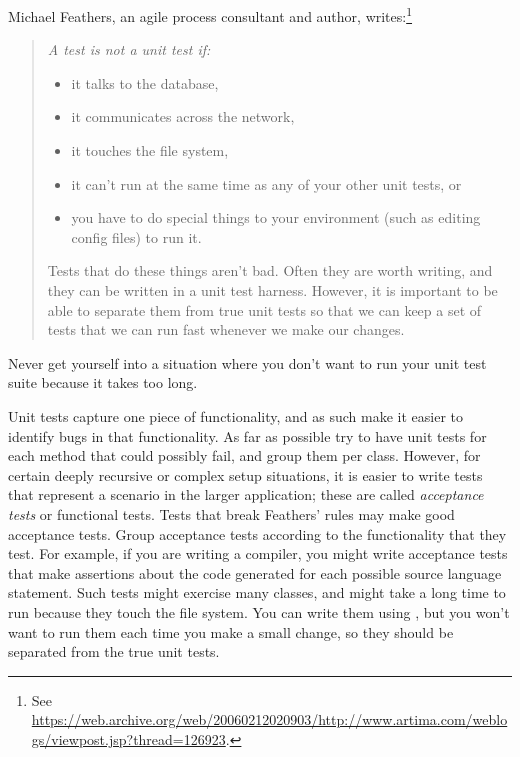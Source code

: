 \documentclass[a4paper,10pt,twoside]{book}
\begin{document}
{\begin{description}
\item[Feathers' Rules for Unit tests.]
	Michael Feathers, an  agile process consultant and author, writes:\footnote{See \url{https://web.archive.org/web/20060212020903/http://www.artima.com/weblogs/viewpost.jsp?thread=126923}.} 
	\begin{quotation}
	\noindent
	{\it
	A test is not a unit test if:
	\begin{itemize}
		\item it talks to the database,
		\item it communicates across the network,
		\item it touches the file system,
		\item it can't run at the same time as any of your other unit tests, or
		\item you have to do special things to your environment (such as editing config files) to run it.
	\end{itemize}
	Tests that do these things aren't bad.
	Often they are worth writing, and they can be written in a unit test harness.
	However, it is important to be able to separate them from true unit tests so that we can keep a set of tests that we can run fast whenever we make our changes.
 	}
	\end{quotation}
	Never get yourself into a situation where you don't want to run your unit test suite because it takes too long.   

\item[Unit Tests \textit{vs.}\ Acceptance Tests.]
	Unit tests capture one piece of functionality, and as such make it easier to identify bugs in that functionality.
	As far as possible try to have unit tests for each method that could possibly fail, and group them per class.
	However, for certain deeply recursive or complex setup situations, it is easier to write tests that represent a scenario in the larger application; these are called \emph{acceptance tests} or functional tests.
	Tests that break Feathers' rules may make good acceptance tests.
	Group acceptance tests according to the functionality that they test.
	For example, if you are writing a compiler, you might write acceptance tests that make  assertions about the code generated for each possible source language statement.
	Such tests might exercise many classes, and might take a long time to run because they touch the file system.
	You can write them using \sunit, but you won't want to run them each time you make a small change, so they should be separated from the true unit tests.


\end{description}}
\end{document}
